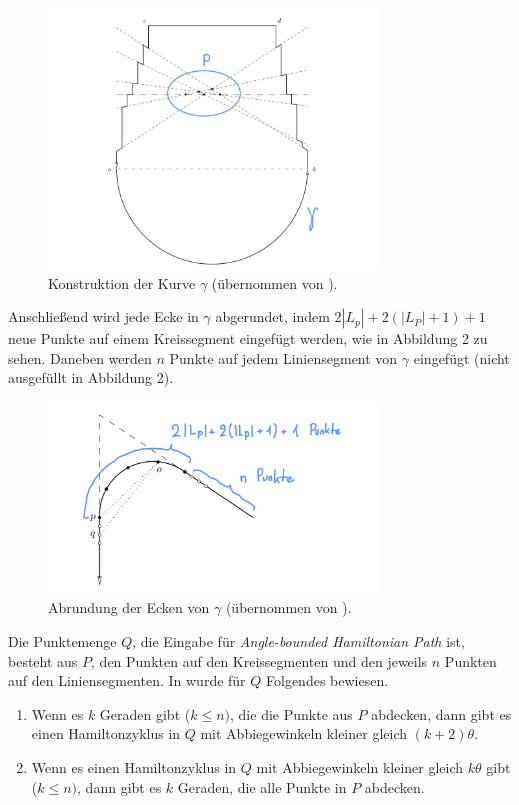 \documentclass[a4paper, 10pt, ngerman]{article}
\begin{document}
\begin{figure}[h]
    \centering
    \includegraphics[width=250pt]{grafiken/wenigerkrumm-np1.jpg}
    \caption{Konstruktion der Kurve $\gamma$ (übernommen von \cite{nphard}).}
\end{figure}

Anschließend wird jede Ecke in $\gamma$ abgerundet, indem $2|L_p| + 2(|L_P| + 1) + 1$ neue Punkte auf einem Kreissegment eingefügt werden, wie in Abbildung 2 zu sehen. Daneben werden $n$ Punkte auf jedem Liniensegment von $\gamma$ eingefügt (nicht ausgefüllt in Abbildung 2).

\begin{figure}[h]
    \centering
    \includegraphics[width=250pt]{grafiken/wenigerkrumm-np2.jpg}
    \caption{Abrundung der Ecken von $\gamma$ (übernommen von \cite{nphard}).}
\end{figure}

 Die Punktemenge $Q$, die Eingabe für \emph{Angle-bounded Hamiltonian Path} ist, besteht aus $P$, den Punkten auf den Kreissegmenten und den jeweils $n$ Punkten auf den Liniensegmenten. In \cite{nphard} wurde für $Q$ Folgendes bewiesen.

\begin{enumerate}
    \item Wenn es $k$ Geraden gibt ($k \le n)$, die die Punkte aus $P$ abdecken, dann gibt es einen Hamiltonzyklus in $Q$ mit Abbiegewinkeln kleiner gleich $(k + 2)\theta$.
    \item Wenn es einen Hamiltonzyklus in $Q$ mit Abbiegewinkeln kleiner gleich $k\theta$ gibt ($k \le n)$, dann gibt es $k$ Geraden, die alle Punkte in $P$ abdecken. 
\end{enumerate}
\end{document}
